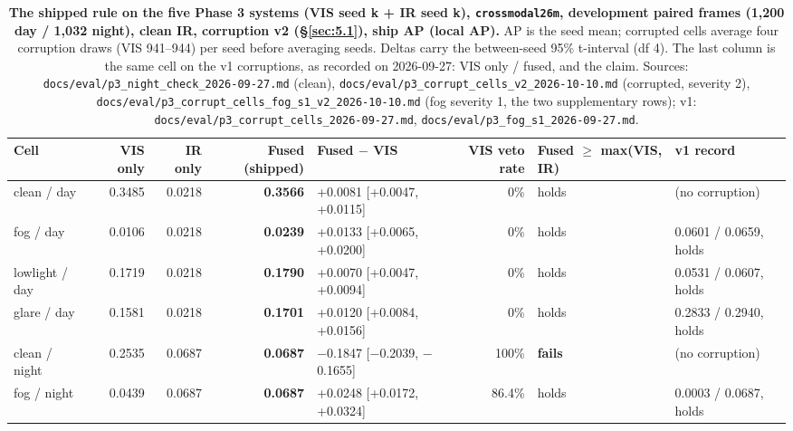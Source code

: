 \documentclass[10pt]{article}
\begin{document}
\begin{table}[htbp]
\centering
\footnotesize
\caption{\textbf{The shipped rule on the five Phase 3 systems (VIS seed k + IR seed k), \texttt{crossmodal26m}, development paired frames (1,200 day / 1,032 night), clean IR, corruption v2 (\S\ref{sec:5.1}), ship AP (local AP).} AP is the seed mean; corrupted cells average four corruption draws (VIS 941--944) per seed before averaging seeds. Deltas carry the between-seed 95\% t-interval (df 4). The last column is the same cell on the v1 corruptions, as recorded on 2026-09-27: VIS only / fused, and the claim. Sources: \texttt{docs/\allowbreak{}eval/\allowbreak{}p3\_\allowbreak{}night\_\allowbreak{}check\_\allowbreak{}2026-09-27.md} (clean), \texttt{docs/\allowbreak{}eval/\allowbreak{}p3\_\allowbreak{}corrupt\_\allowbreak{}cells\_\allowbreak{}v2\_\allowbreak{}2026-10-10.md} (corrupted, severity 2), \texttt{docs/\allowbreak{}eval/\allowbreak{}p3\_\allowbreak{}corrupt\_\allowbreak{}cells\_\allowbreak{}fog\_\allowbreak{}s1\_\allowbreak{}v2\_\allowbreak{}2026-10-10.md} (fog severity 1, the two supplementary rows); v1: \texttt{docs/\allowbreak{}eval/\allowbreak{}p3\_\allowbreak{}corrupt\_\allowbreak{}cells\_\allowbreak{}2026-09-27.md}, \texttt{docs/\allowbreak{}eval/\allowbreak{}p3\_\allowbreak{}fog\_\allowbreak{}s1\_\allowbreak{}2026-09-27.md}.}
\label{tab:3b}
\setlength{\tabcolsep}{3pt}
\begin{adjustbox}{max width=\linewidth}
\begin{tabular}{lrrrlrll}
\toprule
Cell & VIS only & IR only & Fused (shipped) & Fused $-$ VIS & VIS veto rate & Fused $\geq$ max(VIS, IR) & v1 record \\
\midrule
clean / day & 0.3485 & 0.0218 & \textbf{0.3566} & +0.0081 [+0.0047, +0.0115] & 0\% & holds & (no corruption) \\
fog / day & 0.0106 & 0.0218 & \textbf{0.0239} & +0.0133 [+0.0065, +0.0200] & 0\% & holds & 0.0601 / 0.0659, holds \\
lowlight / day & 0.1719 & 0.0218 & \textbf{0.1790} & +0.0070 [+0.0047, +0.0094] & 0\% & holds & 0.0531 / 0.0607, holds \\
glare / day & 0.1581 & 0.0218 & \textbf{0.1701} & +0.0120 [+0.0084, +0.0156] & 0\% & holds & 0.2833 / 0.2940, holds \\
clean / night & 0.2535 & 0.0687 & \textbf{0.0687} & $-$0.1847 [$-$0.2039, $-$0.1655] & 100\% & \textbf{fails} & (no corruption) \\
fog / night & 0.0439 & 0.0687 & \textbf{0.0687} & +0.0248 [+0.0172, +0.0324] & 86.4\% & holds & 0.0003 / 0.0687, holds \\

\end{tabular}
\end{adjustbox}
\end{table}
\end{document}
